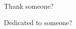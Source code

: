 \vspace*{7cm}
\begin{center}
Thank someone?
\end{center}
\vspace{0.6cm}
\begin{center}
Dedicated to someone?
\end{center}
